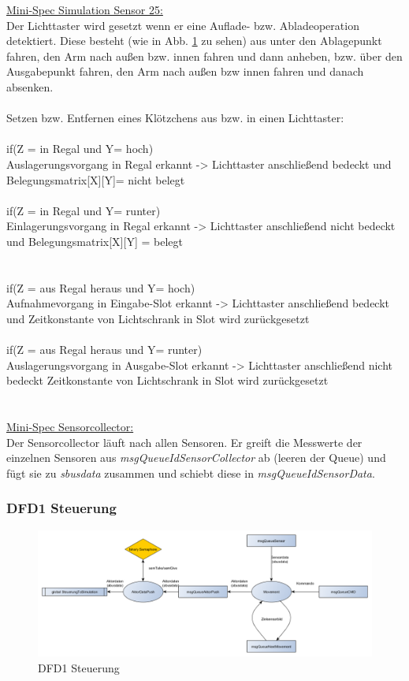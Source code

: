 \underline{Mini-Spec Simulation Sensor 25:}\\
Der Lichttaster wird gesetzt wenn er eine Auflade- bzw. Abladeoperation detektiert. Diese besteht (wie in Abb. \ref{fig3} zu sehen) aus unter den Ablagepunkt fahren, den Arm nach außen bzw. innen fahren und dann anheben, bzw. über den Ausgabepunkt fahren, den Arm nach außen bzw innen fahren und danach absenken.\\ \\
Setzen bzw. Entfernen eines Klötzchens aus bzw. in einen Lichttaster:\\ \\
if(Z = in Regal und Y= hoch) \\
Auslagerungsvorgang in Regal erkannt -> Lichttaster anschließend bedeckt und Belegungsmatrix[X][Y]= nicht belegt\\
\\
if(Z = in Regal und Y= runter)\\
Einlagerungsvorgang in Regal erkannt -> Lichttaster anschließend nicht bedeckt und Belegungsmatrix[X][Y] = belegt \\
\\
\\
if(Z = aus Regal heraus und Y= hoch)\\
Aufnahmevorgang in Eingabe-Slot erkannt -> Lichttaster anschließend bedeckt und Zeitkonstante von Lichtschrank in Slot wird zurückgesetzt\\
\\
if(Z = aus Regal heraus und Y= runter)\\
Auslagerungsvorgang in Ausgabe-Slot erkannt -> Lichttaster anschließend nicht bedeckt  Zeitkonstante von Lichtschrank in Slot wird zurückgesetzt\ \\
\\
\\
\underline{Mini-Spec Sensorcollector:}\\
Der Sensorcollector läuft nach allen Sensoren. Er  greift die Messwerte der einzelnen Sensoren aus \textit{msgQueueIdSensorCollector} ab (leeren der Queue) und fügt sie zu \textit{sbusdata} zusammen und schiebt diese in \textit{msgQueueIdSensorData}.\\ 


\subsubsection{DFD1 Steuerung}
\begin{figure}[H]
	\centering
  \includegraphics[width=\textwidth]{DFD/dfd1_steuerung.png}
	\caption{DFD1 Steuerung}
	\label{fig3}
\end{figure}


